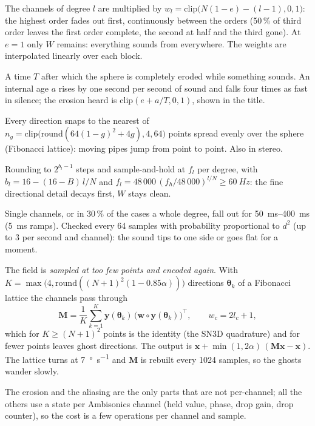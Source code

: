 \documentclass[11pt,a4paper,parskip=half,DIV=11,toc=bibliography]{scrartcl}
\newcommand{\ui}[1]{\emph{#1}}                 %
\begin{document}
\begin{description}[style=nextline,leftmargin=1.2em]
\item[{\ui{Ordnung abtragen} (erosion $e\in[0,1]$).}] The channels of degree $l$ are multiplied by
  $w_l=\mathrm{clip}\bigl(N(1-e)-(l-1),0,1\bigr)$: the highest order fades out first, continuously between the
  orders (50\,\% of third order leaves the first order complete, the second at half and the third gone). At
  $e=1$ only $W$ remains: everything sounds from everywhere. The weights are interpolated linearly over
  each block.
\item[{\ui{Verwittern} (weathering).}] A time $T$ after which the sphere is completely eroded while something
  sounds. An internal age $a$ rises by one second per second of sound and falls four times as fast in silence;
  the erosion heard is $\mathrm{clip}(e + a/T,0,1)$, shown in the title.
\item[{\ui{Richtungsraster} (grid $g$).}] Every direction snaps to the nearest of $n_g=\mathrm{clip}\bigl(\mathrm{round}(64(1-g)^2+4g),4,64\bigr)$ points
  spread evenly over the sphere (Fibonacci lattice): moving pipes jump from point to point. Also in stereo.
\item[{\ui{Raum-Bittiefe}, \ui{Raum-Abtastrate}.}] Rounding to $2^{b_l-1}$ steps and sample-and-hold at $f_l$ per
  degree, with
  $b_l = 16-(16-B)\,l/N$ and $f_l = 48\,000\,(f_h/48\,000)^{l/N}\ge\SI{60}{Hz}$:
  the fine directional detail decays first, $W$ stays clean.
\item[{\ui{Raum-Aussetzer} (drops $d$).}] Single channels, or in 30\,\% of the cases a whole degree, fall out for
  \SIrange{50}{400}{ms} (\SI{5}{ms} ramps). Checked every 64 samples with probability proportional to $d^2$
  (up to 3 per second and channel): the sound tips to one side or goes flat for a moment.
\item[{\ui{Raum-Aliasing} (alias $\alpha$).}] The field is \emph{sampled at too few points and encoded again}.
  With $K=\max\bigl(4,\mathrm{round}((N+1)^2(1-0.85\alpha))\bigr)$ directions $\boldsymbol\theta_k$ of a Fibonacci lattice
  the channels pass through
  \begin{equation}
    \mathbf M=\frac1K\sum_{k=1}^{K}\mathbf y(\boldsymbol\theta_k)\,\bigl(\mathbf w\circ\mathbf y(\boldsymbol\theta_k)\bigr)^{\!\top},\qquad w_c=2l_c+1,
  \end{equation}
  which for $K\ge(N+1)^2$ points is the identity (the SN3D quadrature) and for fewer points leaves ghost
  directions. The output is $\mathbf x+\min(1,2\alpha)\,(\mathbf M\mathbf x-\mathbf x)$. The lattice turns at \SI{7}{\degree\per\second}
  and $\mathbf M$ is rebuilt every 1024 samples, so the ghosts wander slowly.
\end{description}
The erosion and the aliasing are the only parts that are not per-channel; all the others use a state per
Ambisonics channel (held value, phase, drop gain, drop counter), so the cost is a few operations per channel
and sample.
\end{document}
